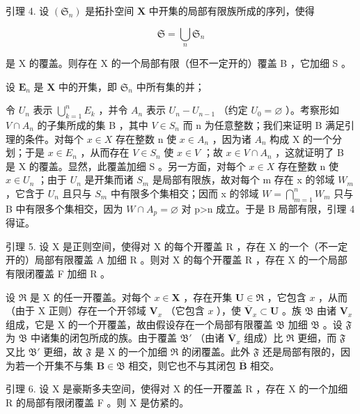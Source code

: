 引理 4. 设 \((\mathfrak{S}_n)\) 是拓扑空间 \(\mathbf{X}\) 中开集的局部有限族所成的序列，使得

\[
\mathfrak {S} = \bigcup_ {n} \mathfrak {S} _ {n}
\]

是 X 的覆盖。则存在 X 的一个局部有限（但不一定开的）覆盖 B ，它加细 S 。

设 \(\mathbf{E}_n\) 是 \(\mathbf{X}\) 中的开集，即 \(\mathfrak{S}_n\) 中所有集的并；

令 \(U_{n}\) 表示 \(\bigcup_{k=1}^{n}E_{k}\) ，并令 \(A_{n}\) 表示 \(U_{n}-U_{n-1}\) （约定 \(U_{0}=\varnothing\) ）。考察形如 \(V\cap A_{n}\) 的子集所成的集 B ，其中 \(V\in S_{n}\) 而 n 为任意整数；我们来证明 B 满足引理的条件。对每个 \(x\in X\) 存在整数 n 使 \(x\in A_{n}\) ，因为诸 \(A_{n}\) 构成 X 的一个分划；于是 \(x\in E_{n}\) ，从而存在 \(V\in S_{n}\) 使 \(x\in V\) ；故 \(x\in V\cap A_{n}\) ，这就证明了 B 是 X 的覆盖。显然，此覆盖加细 S 。另一方面，对每个 \(x\in X\) 存在整数 n 使 \(x\in U_{n}\) ；由于 \(U_{n}\) 是开集而诸 \(S_{m}\) 是局部有限族，故对每个 m 存在 x 的邻域 \(W_{m}\) ，它含于 \(U_{n}\) 且只与 \(S_{m}\) 中有限多个集相交；因而 x 的邻域 \(W=\bigcap_{m=1}^{n}W_{m}\) 只与 B 中有限多个集相交，因为 \(W\cap A_{p}=\varnothing\) 对 p\textgreater n 成立。于是 B 局部有限，引理 4 得证。

引理 5. 设 X 是正则空间，使得对 X 的每个开覆盖 R ，存在 X 的一个（不一定开的）局部有限覆盖 A 加细 R 。则对 X 的每个开覆盖 R ，存在 X 的一个局部有限闭覆盖 F 加细 R 。

设 \(\mathfrak{R}\) 是 X 的任一开覆盖。对每个 \(x \in \mathbf{X}\) ，存在开集 \(\mathbf{U} \in \mathfrak{R}\) ，它包含 \(x\) ，从而（由于 X 正则）存在一个开邻域 \(\mathbf{V}_x\) （它包含 \(x\) ），使 \(\overline{\mathbf{V}}_x \subset \mathbf{U}\) 。族 \(\mathfrak{B}\) 由诸 \(\mathbf{V}_x\) 组成，它是 X 的一个开覆盖，故由假设存在一个局部有限覆盖 \(\mathfrak{B}\) 加细 \(\mathfrak{B}\) 。设 \(\mathfrak{F}\) 为 \(\mathfrak{B}\) 中诸集的闭包所成的族。由于覆盖 \(\mathfrak{B}'\) （由诸 \(\overline{\mathbf{V}}_x\) 组成）比 \(\mathfrak{R}\) 更细，而 \(\mathfrak{F}\) 又比 \(\mathfrak{B}'\) 更细，故 \(\mathfrak{F}\) 是 X 的一个加细 \(\mathfrak{R}\) 的闭覆盖。此外 \(\mathfrak{F}\) 还是局部有限的，因为若一个开集不与集 \(\mathbf{B} \in \mathfrak{B}\) 相交，则它也不与其闭包 \(\overline{\mathbf{B}}\) 相交。

引理 6. 设 X 是豪斯多夫空间，使得对 X 的任一开覆盖 R ，存在 X 的一个加细 R 的局部有限闭覆盖 F 。则 X 是仿紧的。

